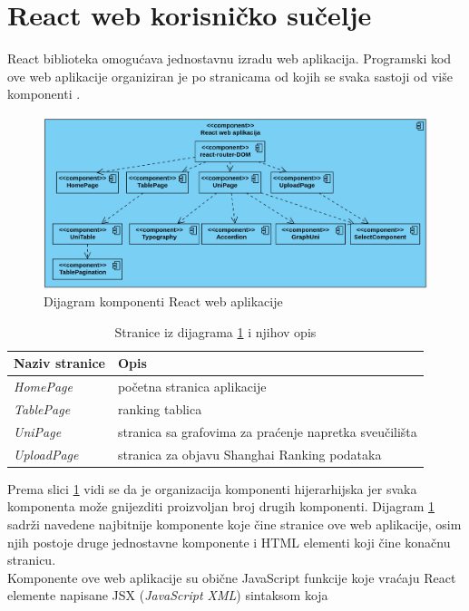 \documentclass[times, utf8, zavrsni]{fer}
\begin{document}
\section{React web korisničko sučelje}
React biblioteka omogućava jednostavnu izradu web aplikacija. Programski kod ove web aplikacije organiziran je po stranicama  od kojih se svaka 
sastoji od više komponenti .
\begin{figure}[htb]
    \hspace{-1.5cm}
       \includegraphics[scale=0.27]{reactkomponente.png} 
       \caption{Dijagram komponenti React web aplikacije}
       \label{fig:reactkomponente}
       \end{figure}
       \begin{table}[htb]
        \caption{Stranice iz dijagrama \ref{fig:reactkomponente} i njihov opis}
            \label{tbl:stranice}
            \centering
            \begin{tabular}{ll} \hline
            Naziv stranice & Opis\\ \hline
            \emph{HomePage} & početna stranica aplikacije\\
            \emph{TablePage} & ranking tablica\\
            \emph{UniPage} & stranica sa grafovima za praćenje napretka sveučilišta\\
            \emph{UploadPage} & stranica za objavu Shanghai Ranking podataka
            \end{tabular} 
            \end{table} 
            \FloatBarrier
Prema slici \ref{fig:reactkomponente} vidi se da je organizacija komponenti hijerarhijska jer svaka komponenta može gnijezditi proizvoljan broj drugih komponenti.
Dijagram \ref{fig:reactkomponente} sadrži navedene najbitnije komponente koje čine stranice ove web aplikacije, osim njih postoje druge jednostavne komponente i HTML elementi 
koji čine konačnu stranicu. \\Komponente ove web aplikacije su obične JavaScript funkcije koje vraćaju React elemente napisane JSX (\emph{JavaScript XML}) sintaksom koja 
\end{document}
